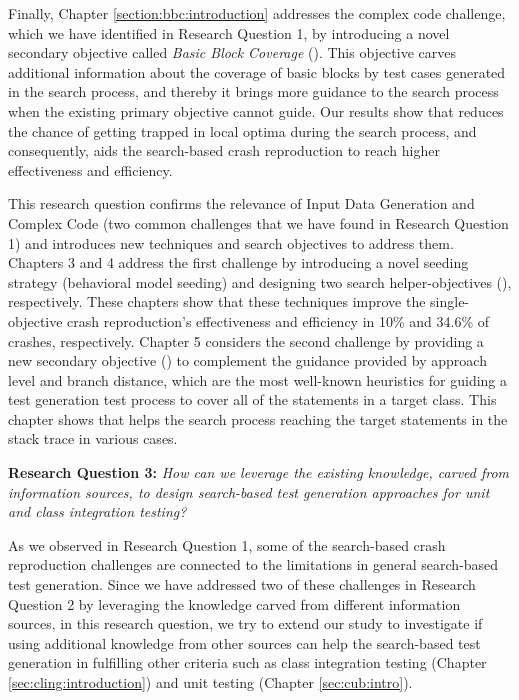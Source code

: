 Finally, Chapter \ref{section:bbc:introduction} addresses the complex code challenge, which we have identified in Research Question 1, by introducing a novel secondary objective called \textit{Basic Block Coverage} (\bbc). This objective carves additional information about the coverage of basic blocks by test cases generated in the search process, and thereby it brings more guidance to the search process when the existing primary objective cannot guide. Our results show that \bbc reduces the chance of getting trapped in local optima during the search process, and consequently, aids the search-based crash reproduction to reach higher effectiveness and efficiency.

This research question confirms the relevance of Input Data Generation and Complex Code (two common challenges that we have found in Research Question 1) and introduces new techniques and search objectives to address them. Chapters 3 and 4 address the first challenge by introducing a novel seeding strategy (behavioral model seeding) and designing two search helper-objectives (\moho), respectively. These chapters show that these techniques improve the single-objective crash reproduction's effectiveness and efficiency in 10\% and 34.6\% of crashes, respectively.
Chapter 5 considers the second challenge by providing a new secondary objective (\bbc) to complement the guidance provided by approach level and branch distance, which are the most well-known heuristics for guiding a test generation test process to cover all of the statements in a target class. This chapter shows that \bbc helps the search process reaching the target statements in the stack trace in various cases.


\textbf{Research Question 3: }\textit{How can we leverage the existing knowledge, carved from information sources, to design search-based test generation approaches for unit and class integration testing?}

As we observed in Research Question 1, some of the search-based crash reproduction challenges are connected to the limitations in general search-based test generation. Since we have addressed two of these challenges in Research Question 2 by leveraging the knowledge carved from different information sources, in this research question, we try to extend our study to investigate if using additional knowledge from other sources can help the search-based test generation in fulfilling other criteria such as class integration testing (Chapter \ref{sec:cling:introduction}) and unit testing (Chapter \ref{sec:cub:intro}).

